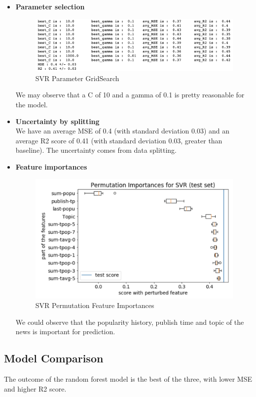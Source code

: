 \documentclass{article}
\begin{document}
\begin{itemize}
\item \textbf{Parameter selection}

\begin{figure}[H]
\centering
\includegraphics[scale=0.4]{"svr_param"}
\caption{SVR Parameter GridSearch}
\end{figure}
We may observe that a C of 10 and a gamma of 0.1 is pretty reasonable for the model. 
\item \textbf{Uncertainty by splitting}\\
We have an average MSE of 0.4 (with standard deviation 0.03) and an average R2 score of 0.41 (with standard deviation 0.03, greater than baseline). The uncertainty comes from data splitting.
\item \textbf{Feature importances}
\begin{figure}[H]
\centering
\includegraphics[scale=0.5]{"svr_perm_imp"}
\caption{SVR Permutation Feature Importances}
\end{figure}
We could observe that the popularity history, publish time and topic of the news is important for prediction.
\end{itemize}


\subsection{Model Comparison}
The outcome of the random forest model is the best of the three, with lower MSE and higher R2 score.
\end{document}
